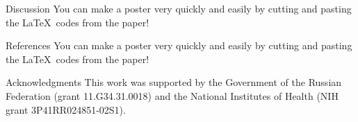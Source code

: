 \documentclass[final,hyperref={pdfpagelabels=false}]{beamer}
\begin{document}
\begin{frame}{}
\begin{columns}[t]
\begin{column}{0.32\linewidth}
\begin{block}{Discussion} \justifying
You can make a poster very quickly and easily by cutting and pasting the \LaTeX~codes from the paper!
\end{block}

\begin{block}{References} \justifying
You can make a poster very quickly and easily by cutting and pasting the \LaTeX~codes from the paper!
\end{block}

\begin{block}{Acknowledgments} \justifying
This work was supported by the Government of the Russian Federation (grant 11.G34.31.0018)
and the National Institutes of Health (NIH grant 3P41RR024851-02S1).
\end{block}

\end{column}

\end{columns}

\end{frame}
\end{document}
